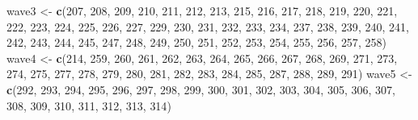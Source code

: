 \documentclass[
]{book}
\newenvironment{Shaded}{\begin{snugshade}}{\end{snugshade}}
\newcommand{\DecValTok}[1]{\textcolor[rgb]{0.00,0.00,0.81}{#1}}
\newcommand{\KeywordTok}[1]{\textcolor[rgb]{0.13,0.29,0.53}{\textbf{#1}}}
\newcommand{\NormalTok}[1]{#1}
\newcommand{\StringTok}[1]{\textcolor[rgb]{0.31,0.60,0.02}{#1}}
\begin{document}
\begin{Shaded}
\begin{Highlighting}[]
\NormalTok{wave3 <-}\StringTok{ }\KeywordTok{c}\NormalTok{(}\DecValTok{207}\NormalTok{, }\DecValTok{208}\NormalTok{,  }\DecValTok{209}\NormalTok{,  }\DecValTok{210}\NormalTok{,  }\DecValTok{211}\NormalTok{,  }\DecValTok{212}\NormalTok{,  }\DecValTok{213}\NormalTok{,  }\DecValTok{215}\NormalTok{,  }\DecValTok{216}\NormalTok{,  }\DecValTok{217}\NormalTok{,  }\DecValTok{218}\NormalTok{,  }\DecValTok{219}\NormalTok{,  }\DecValTok{220}\NormalTok{,  }\DecValTok{221}\NormalTok{,  }\DecValTok{222}\NormalTok{,  }\DecValTok{223}\NormalTok{,  }\DecValTok{224}\NormalTok{,  }\DecValTok{225}\NormalTok{,  }\DecValTok{226}\NormalTok{,  }\DecValTok{227}\NormalTok{,  }\DecValTok{229}\NormalTok{,  }\DecValTok{230}\NormalTok{,  }\DecValTok{231}\NormalTok{,}
           \DecValTok{232}\NormalTok{, }\DecValTok{233}\NormalTok{,  }\DecValTok{234}\NormalTok{,  }\DecValTok{237}\NormalTok{,  }\DecValTok{238}\NormalTok{,  }\DecValTok{239}\NormalTok{,  }\DecValTok{240}\NormalTok{,  }\DecValTok{241}\NormalTok{,  }\DecValTok{242}\NormalTok{,  }\DecValTok{243}\NormalTok{,  }\DecValTok{244}\NormalTok{,  }\DecValTok{245}\NormalTok{,  }\DecValTok{247}\NormalTok{,  }\DecValTok{248}\NormalTok{,  }\DecValTok{249}\NormalTok{,  }\DecValTok{250}\NormalTok{,  }\DecValTok{251}\NormalTok{,  }\DecValTok{252}\NormalTok{,  }\DecValTok{253}\NormalTok{,  }\DecValTok{254}\NormalTok{,  }\DecValTok{255}\NormalTok{,  }\DecValTok{256}\NormalTok{,  }\DecValTok{257}\NormalTok{, }
           \DecValTok{258}\NormalTok{)}
\NormalTok{wave4 <-}\StringTok{ }\KeywordTok{c}\NormalTok{(}\DecValTok{214}\NormalTok{, }\DecValTok{259}\NormalTok{,    }\DecValTok{260}\NormalTok{,    }\DecValTok{261}\NormalTok{,    }\DecValTok{262}\NormalTok{,    }\DecValTok{263}\NormalTok{,    }\DecValTok{264}\NormalTok{,    }\DecValTok{265}\NormalTok{,    }\DecValTok{266}\NormalTok{,    }\DecValTok{267}\NormalTok{,    }\DecValTok{268}\NormalTok{,    }\DecValTok{269}\NormalTok{,    }\DecValTok{271}\NormalTok{,    }\DecValTok{273}\NormalTok{,    }\DecValTok{274}\NormalTok{,    }\DecValTok{275}\NormalTok{,    }\DecValTok{277}\NormalTok{,    }\DecValTok{278}\NormalTok{,    }\DecValTok{279}\NormalTok{,    }\DecValTok{280}\NormalTok{,    }\DecValTok{281}\NormalTok{,    }\DecValTok{282}\NormalTok{,    }\DecValTok{283}\NormalTok{,}
           \DecValTok{284}\NormalTok{, }\DecValTok{285}\NormalTok{,    }\DecValTok{287}\NormalTok{,    }\DecValTok{288}\NormalTok{,    }\DecValTok{289}\NormalTok{,    }\DecValTok{291}\NormalTok{)}
\NormalTok{wave5 <-}\StringTok{ }\KeywordTok{c}\NormalTok{(}\DecValTok{292}\NormalTok{, }\DecValTok{293}\NormalTok{,    }\DecValTok{294}\NormalTok{,    }\DecValTok{295}\NormalTok{,    }\DecValTok{296}\NormalTok{,    }\DecValTok{297}\NormalTok{,    }\DecValTok{298}\NormalTok{,    }\DecValTok{299}\NormalTok{,    }\DecValTok{300}\NormalTok{,    }\DecValTok{301}\NormalTok{,    }\DecValTok{302}\NormalTok{,    }\DecValTok{303}\NormalTok{,    }\DecValTok{304}\NormalTok{,    }\DecValTok{305}\NormalTok{,    }\DecValTok{306}\NormalTok{,    }\DecValTok{307}\NormalTok{,    }\DecValTok{308}\NormalTok{,    }\DecValTok{309}\NormalTok{,    }\DecValTok{310}\NormalTok{,    }\DecValTok{311}\NormalTok{,    }\DecValTok{312}\NormalTok{,    }\DecValTok{313}\NormalTok{,    }\DecValTok{314}\NormalTok{)}

\end{Highlighting}
\end{Shaded}
\end{document}
